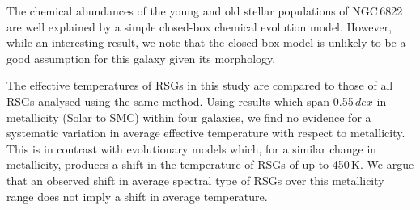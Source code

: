 The chemical abundances of the young and old stellar populations of NGC\,6822 are well explained by a simple closed-box chemical evolution model.
However, while an interesting result, we note that the closed-box model is unlikely to be a good assumption for this galaxy given its morphology.

The effective temperatures of RSGs in this study are compared to those of all RSGs analysed using the same method.
Using results which span 0.55\,$dex$ in metallicity (Solar to SMC) within four galaxies, we find no evidence for a systematic variation in average effective temperature with respect to metallicity.
This is in contrast with evolutionary models which, for a  similar change in metallicity, produces a shift in the temperature of RSGs of up to 450\,K.
We argue that an observed shift in average spectral type of RSGs over this metallicity range does not imply a shift in average temperature.






